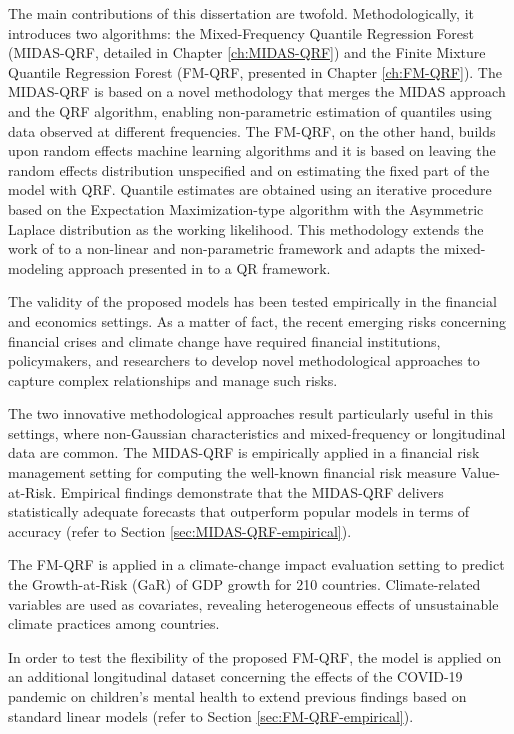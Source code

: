 \vspace{0.15in}

\noindent The main contributions of this dissertation are twofold. Methodologically, it introduces two algorithms: the Mixed-Frequency Quantile Regression Forest (MIDAS-QRF, detailed in Chapter \ref{ch:MIDAS-QRF}) and the Finite Mixture Quantile Regression Forest (FM-QRF, presented in Chapter \ref{ch:FM-QRF}). The MIDAS-QRF is based on a novel methodology that merges the MIDAS approach and the QRF algorithm, enabling non-parametric estimation of quantiles using data observed at different frequencies. The FM-QRF, on the other hand, builds upon random effects machine learning algorithms and it is based on leaving the random effects distribution unspecified and on estimating the fixed part of the model with QRF. Quantile estimates are obtained using an iterative procedure based on the Expectation Maximization-type algorithm with the Asymmetric Laplace distribution as the working likelihood. This methodology extends the work of \cite{geraci2007quantile, geraci2014linear, alfo2017finite} to a non-linear and non-parametric framework and adapts the mixed-modeling approach presented in \cite{hajjem2014mixed} to a QR framework.

\vspace{0.15in}

\noindent The validity of the proposed models has been tested empirically in the financial and economics settings. As a matter of fact, the recent emerging risks concerning financial crises and climate change have required financial institutions, policymakers, and researchers to develop novel methodological approaches to capture complex relationships and manage such risks.

\vspace{0.15in}

\noindent The two innovative methodological approaches result particularly useful in this settings, where non-Gaussian characteristics and mixed-frequency or longitudinal data are common. The MIDAS-QRF is empirically applied in a financial risk management setting for computing the well-known financial risk measure Value-at-Risk. Empirical findings demonstrate that the MIDAS-QRF delivers statistically adequate forecasts that outperform popular models in terms of accuracy (refer to Section \ref{sec:MIDAS-QRF-empirical}).
\vspace{0.15in}


\noindent The FM-QRF is applied in a climate-change impact evaluation setting to predict the Growth-at-Risk (GaR) of GDP growth for 210 countries. Climate-related variables are used as covariates, revealing heterogeneous effects of unsustainable climate practices among countries. 
\vspace{0.15in}

\noindent In order to test the flexibility of the proposed FM-QRF, the model is applied on an additional longitudinal dataset concerning the effects of the COVID-19 pandemic on children's mental health to extend previous findings based on standard linear models (refer to Section \ref{sec:FM-QRF-empirical}).